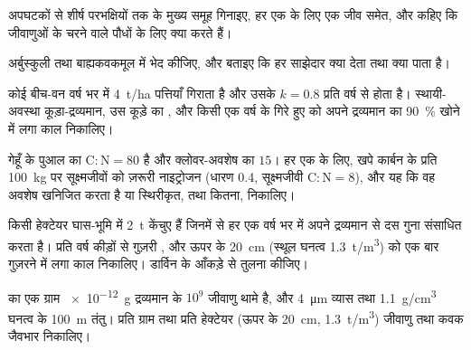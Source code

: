 \begin{exercise}[$\star$]\label{exo:b2:living-soil:3}
अपघटकों से शीर्ष परभक्षियों तक  के मुख्य समूह
गिनाइए, हर एक के लिए एक जीव समेत, और कहिए कि जीवाणुओं के चरने वाले
पौधों के लिए क्या करते हैं।
\end{exercise}

\begin{exercise}[$\star$]\label{exo:b2:living-soil:4}
अर्बुस्कुली तथा बाह्यकवकमूल में भेद कीजिए, और बताइए कि हर
साझेदार क्या देता तथा क्या पाता है।
\end{exercise}

\begin{exercise}[$\star\star$]\label{exo:b2:living-soil:5}
कोई बीच-वन वर्ष भर में \qty{4}{t/ha} पत्तियाँ गिराता है और उसके
 $k = 0.8$ प्रति वर्ष से होता है। स्थायी-अवस्था
कूड़ा-द्रव्यमान, उस कूड़े का , और किसी एक वर्ष के गिरे हुए को
अपने द्रव्यमान का \qty{90}{\%} खोने में लगा काल निकालिए।
\end{exercise}

\begin{exercise}[$\star\star$]\label{exo:b2:living-soil:6}
गेहूँ के पुआल का $\mathrm{C:N} = 80$ है और क्लोवर-अवशेष का $15$। हर
एक के लिए, खपे कार्बन के प्रति \qty{100}{kg} पर सूक्ष्मजीवों को ज़रूरी
नाइट्रोजन (धारण 0.4, सूक्ष्मजीवी $\mathrm{C:N} = 8$), और यह कि
वह अवशेष खनिजित करता है या स्थिरीकृत, तथा कितना, निकालिए।
\end{exercise}

\begin{exercise}[$\star\star$]\label{exo:b2:living-soil:7}
किसी हेक्टेयर घास-भूमि में \qty{2}{t} केंचुए हैं जिनमें से हर एक वर्ष भर में
अपने द्रव्यमान से दस गुना  संसाधित करता है। प्रति वर्ष कीड़ों से गुज़री
, और ऊपर के \qty{20}{cm} (स्थूल घनत्व \qty{1.3}{t/m^3}) को एक बार
गुज़रने में लगा काल निकालिए। डार्विन के आँकड़े से तुलना कीजिए।
\end{exercise}

\begin{exercise}[$\star\star$]\label{exo:b2:living-soil:8}
 का एक ग्राम \qty{e-12}{g} द्रव्यमान के $10^{9}$ जीवाणु थामे है,
और \qty{4}{\micro m} व्यास तथा \qty{1.1}{g/cm^3} घनत्व के
\qty{100}{m} तंतु। प्रति ग्राम तथा प्रति हेक्टेयर (ऊपर के
\qty{20}{cm}, \qty{1.3}{t/m^3}) जीवाणु तथा कवक जैवभार निकालिए।
\end{exercise}

